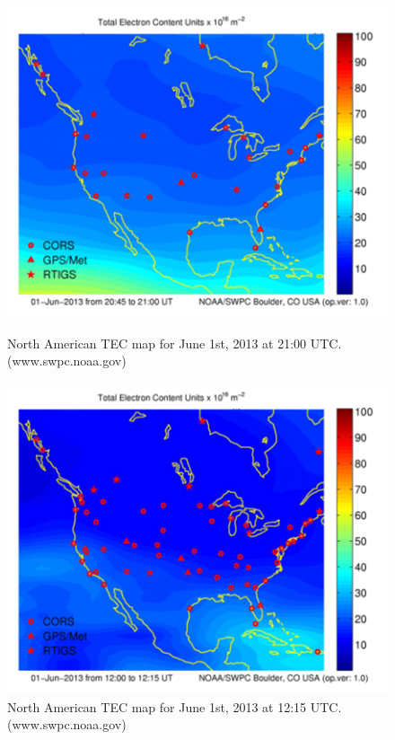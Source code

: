 \begin{figure}[htb]
\centering
\begin{minipage}[b]{0.48\textwidth}
\centering
\includegraphics[width=0.95\linewidth]{Ionosphere/figures/NA_TEC_day.png}
\caption{North American TEC map for June 1st, 2013 at 21:00 UTC. (www.swpc.noaa.gov)   }
\label{Fig:day_TEC_NA}
\end{minipage}%
\begin{minipage}[b]{0.02\textwidth}
\hspace{1cm}
\end{minipage}%
\begin{minipage}[b]{0.48\textwidth}
\centering
\includegraphics[width=0.95\linewidth]{Ionosphere/figures/NA_TEC_night.png}
\caption{North American TEC map for June 1st, 2013 at 12:15 UTC. (www.swpc.noaa.gov) }
\label{Fig:night_TEC_NA}
\end{minipage}
\end{figure}

